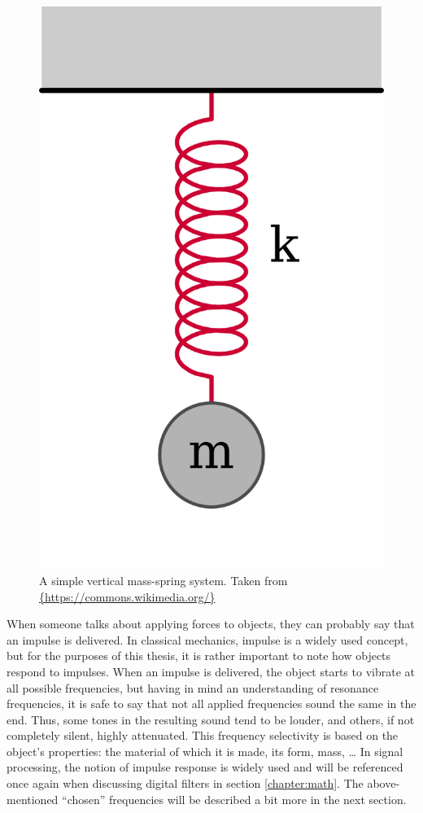 \begin{figure}[t]
	\centering
	\includegraphics[height=0.27\textheight]{include/vertical_mass_spring}
	\caption[A simple vertical mass-spring system]{A simple vertical mass-spring system. Taken from \url{{https://commons.wikimedia.org/}}}
	\label{img:vertical_mass_spring}
\end{figure}

When someone talks about applying forces to objects, they can probably say that an impulse is delivered. In classical mechanics, impulse is a widely used concept, but for the purposes of this thesis, it is rather important to note how objects respond to impulses. When an impulse is delivered, the object starts to vibrate at all possible frequencies, but having in mind an understanding of resonance frequencies, it is safe to say that not all applied frequencies sound the same in the end. Thus, some tones in the resulting sound tend to be louder, and others, if not completely silent, highly attenuated. This frequency selectivity is based on the object's properties: the material of which it is made, its form, mass, \dots{} In signal processing, the notion of impulse response is widely used and will be referenced once again when discussing digital filters in section \ref{chapter:math}. The above-mentioned “chosen” frequencies will be described a bit more in the next section.\pagebreak

